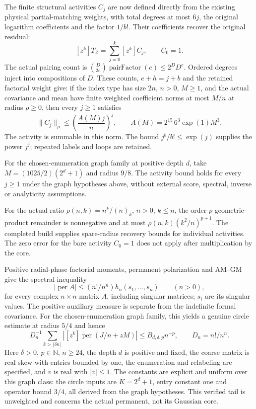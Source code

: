 \documentclass[11pt]{article}
\begin{document}
The finite structural activities $C_j$ are now defined directly from the existing physical partial-matching weights, with total degrees at most $6j$, the original logarithm coefficients and the factor $1/b!$. Their coefficients recover the original residual:
\[
 [z^k]T_Z=\sum_{j=0}^{k}[z^k]C_j,\qquad C_0=1.
\]
The actual pairing count is $\binom{D}{2e}\operatorname{pairFactor}(e)\le2^D D^e$. Ordered degrees inject into compositions of $D$. These counts, $e+h=j+b$ and the retained factorial weight give: if the index type has size $2n$, $n>0$, $M\ge1$, and the actual covariance and mean have finite weighted coefficient norms at most $M/n$ at radius $\rho\ge0$, then every $j\ge1$ satisfies
\[
 \|C_j\|_\rho\le\left(\frac{A(M)j}{n}\right)^j,
 \qquad A(M)=2^{15}\,6^3\exp(1)M^3.
\]
The activity is summable in this norm. The bound $j^b/b!\le\exp(j)$ supplies the power $j^j$; repeated labels and loops are retained.

For the chosen-enumeration graph family at positive depth $d$, take $M=(1025/2)(2^d+1)$ and radius $9/8$. The activity bound holds for every $j\ge1$ under the graph hypotheses above, without external score, spectral, inverse or analyticity assumptions.

For the actual ratio $\rho(n,k)=n^k/(n)_k$, $n>0$, $k\le n$, the order-$p$ geometric-product remainder is nonnegative and at most $\rho(n,k)(k^2/n)^{p+1}$. The completed build supplies spare-radius recovery bounds for individual activities. The zero error for the bare activity $C_0=1$ does not apply after multiplication by the core.

Positive radial-phase factorial moments, permanent polarization and AM--GM give the spectral inequality
\[
 |\operatorname{per}A|\le(n!/n^n)h_n(s_1,\ldots,s_n)\qquad(n>0),
\]
for every complex $n\times n$ matrix $A$, including singular matrices; $s_i$ are its singular values. The positive auxiliary measure is separate from the indefinite formal covariance. For the chosen-enumeration graph family, this yields a genuine circle estimate at radius $5/4$ and hence
\[
 D_n^{-1}\sum_{k>\lfloor\delta n\rfloor}
 |[z^k]\operatorname{per}(J/n+zM)|
 \le B_{d,\delta,p}n^{-p},\qquad D_n=n!/n^n.
\]
Here $\delta>0$, $p\in\mathbb N$, $n\ge24$, the depth $d$ is positive and fixed, the coarse matrix is real skew with entries bounded by one, the enumeration and relabeling are specified, and $v$ is real with $|v|\le1$. The constants are explicit and uniform over this graph class: the circle inputs are $K=2^d+1$, entry constant one and operator bound $3/4$, all derived from the graph hypotheses. This verified tail is unweighted and concerns the actual permanent, not its Gaussian core.
\end{document}
